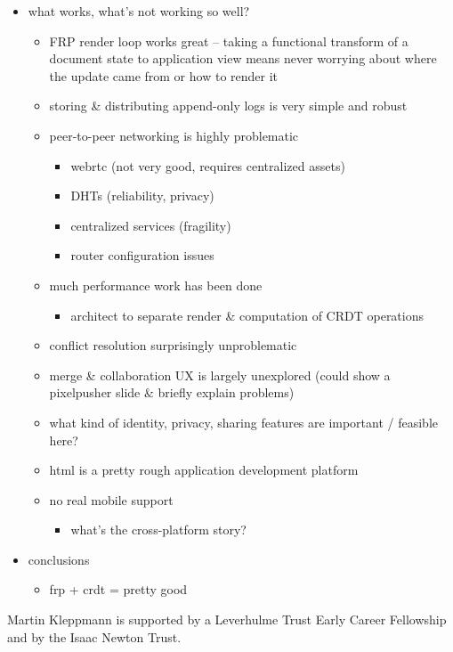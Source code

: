 \documentclass[sigplan,10pt]{acmart}
\begin{document}
\begin{itemize}
\begin{itemize}
    \end{itemize}
    \item what works, what's not working so well?
    \begin{itemize}
	    \item FRP render loop works great -- taking a functional transform of a document state to application view means never worrying about where the update came from or how to render it
	    \item storing \& distributing append-only logs is very simple and robust
	    \item peer-to-peer networking is highly problematic
	    \begin{itemize}
		    \item webrtc (not very good, requires centralized assets)
		    \item DHTs (reliability, privacy)
		    \item centralized services (fragility)
		    \item router configuration issues
		\end{itemize}
	    \item much performance work has been done
	    \begin{itemize}
		    \item architect to separate render \& computation of CRDT operations
		\end{itemize}
	    \item conflict resolution surprisingly unproblematic
	    \item merge \& collaboration UX is largely unexplored (could show a pixelpusher slide \& briefly explain problems)
	    \item what kind of identity, privacy, sharing features are important / feasible here?
	    \item html is a pretty rough application development platform
	    \item no real mobile support
	    \begin{itemize}
	        \item what's the cross-platform story?
	    \end{itemize}
    \end{itemize}
    \item conclusions
    \begin{itemize}
	    \item frp + crdt = pretty good
	\end{itemize}
\end{itemize}

\begin{acks}
Martin Kleppmann is supported by a Leverhulme Trust Early Career Fellowship and by the Isaac Newton Trust.
\end{acks}


{}
\end{document}
